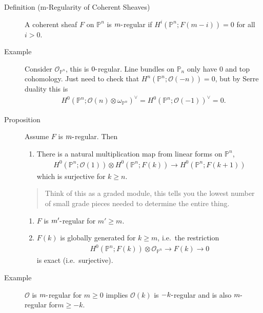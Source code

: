 \begin{description}
\item[Definition (m-Regularity of Coherent Sheaves)]
A coherent sheaf \(F\) on \({\mathbb{P}}^n\) is \(m{\hbox{-}}\)regular
if \(H^i({\mathbb{P}}^n; F(m-i)) = 0\) for all \(i> 0\).
\item[Example]
Consider \({\mathcal{O}}_{{\mathbb{P}}^n}\), this is
\(0{\hbox{-}}\)regular. Line bundles on \({\mathbb{P}}_n\) only have 0
and top cohomology. Just need to check that
\(H^n({\mathbb{P}}^n; {\mathcal{O}}(-n)) = 0\), but by Serre duality
this is
\begin{align*}
  H^0({\mathbb{P}}^n; {\mathcal{O}}(n) \otimes\omega_{{\mathbb{P}}^n})^\vee= H^0({\mathbb{P}}^n; {\mathcal{O}}(-1))^\vee= 0
  .\end{align*}
\item[Proposition]
Assume \(F\) is \(m{\hbox{-}}\)regular. Then

\begin{enumerate}
\def\labelenumi{\arabic{enumi}.}
\tightlist
\item
  There is a natural multiplication map from linear forms on
  \({\mathbb{P}}^n\),
  \begin{align*}
  H^0({\mathbb{P}}^n; {\mathcal{O}}(1)) \otimes H^0({\mathbb{P}}^n; F(k)) \to H^0({\mathbb{P}}^n; F(k+1))
  \end{align*}
  which is surjective for \(k\geq n\).
\end{enumerate}

\begin{quote}
Think of this as a graded module, this tells you the lowest number of
small grade pieces needed to determine the entire thing.
\end{quote}

\begin{enumerate}
\def\labelenumi{\arabic{enumi}.}
\setcounter{enumi}{1}
\item
  \(F\) is \(m'{\hbox{-}}\)regular for \(m' \geq m\).
\item
  \(F(k)\) is globally generated for \(k\geq m\), i.e.~the restriction
  \begin{align*}
  H^0({\mathbb{P}}^n; F(k)) \otimes{\mathcal{O}}_{{\mathbb{P}}^n} \to F(k) \to 0
  \end{align*}
  is exact (i.e.~surjective).
\end{enumerate}
\item[Example]
\({\mathcal{O}}\) is \(m{\hbox{-}}\)regular for \(m \geq 0\) implies
\({\mathcal{O}}(k)\) is \(-k{\hbox{-}}\)regular and is also
\(m{\hbox{-}}\)regular for\(m\geq -k\).
\end{description}

